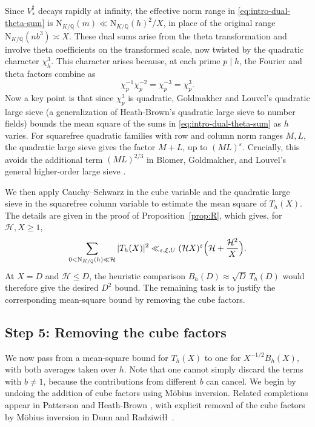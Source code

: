 \documentclass[11pt,a4paper]{article}
\numberwithin{equation}{section}
\numberwithin{figure}{section}
\theoremstyle{definition}
\theoremstyle{remark}
\newcommand{\Q}{\mathbb Q}
\newcommand{\NK}{\mathrm N_{K/\Q}}
\begin{document}
Since $V_*^\sharp$ decays rapidly at infinity, the effective norm range in \eqref{eq:intro-dual-theta-sum} is $\NK(m)\ll\NK(h)^2/X$, in place of the original range $\NK(nb^3)\asymp X$. These dual sums arise from the theta transformation and involve theta coefficients on the transformed scale, now twisted by the quadratic character $\chi_h^3$. This character arises because, at each prime $p\mid h$, the Fourier and theta factors combine as
\begin{equation}\label{eq:intro-quadratic-twist}
 \chi_p^{-1}\chi_p^{-2}=\chi_p^{-3}=\chi_p^3.
\end{equation}
Now a key point is that since $\chi_p^3$ is quadratic, Goldmakher and Louvel's quadratic large sieve \cite[Theorem~1.1 and Corollary~1.2]{GL} (a generalization of Heath-Brown's quadratic large sieve \cite{HB95} to number fields) bounds the mean square of the sums in \eqref{eq:intro-dual-theta-sum} as $h$ varies. For squarefree quadratic families with row and column norm ranges $M,L$, the quadratic large sieve gives the factor $M+L$, up to $(ML)^\varepsilon$. Crucially, this avoids the additional term $(ML)^{2/3}$ in Blomer, Goldmakher, and Louvel's general higher-order large sieve \cite[Theorem~1.3]{BGL}.

We then apply Cauchy--Schwarz in the cube variable and the quadratic
large sieve in the squarefree column variable to estimate the mean square of $T_h(X)$. The details are given in the proof of Proposition~\ref{prop:R}, which gives, for $\mathcal H,X\ge1$,
\begin{equation}\label{eq:intro-completed-ms}
 \sum_{0<\NK(h)\ll\mathcal H}|T_h(X)|^2
 \ll_{\varepsilon,\xi,U}(\mathcal H X)^\varepsilon
       \Bigl(\mathcal H+\frac{\mathcal H^2}{X}\Bigr).
\end{equation}
At $X=D$ and $\mathcal H\le D$, the heuristic comparison
$B_h(D)\approx\sqrt D\,T_h(D)$ would therefore give the desired
$D^2$ bound. The remaining task is to justify the corresponding
mean-square bound by removing the cube factors.

\subsection{Step 5: Removing the cube factors} 
We now pass from a mean-square bound for $T_h(X)$ to one for $X^{-1/2}B_h(X)$, with both averages taken over $h$. Note that one cannot simply discard the terms with $b\ne1$, because the contributions from different $b$ can cancel. We begin by undoing the addition of cube factors using M\"obius inversion. Related completions appear in Patterson \cite[Theorem~6.1]{Pat77} and Heath-Brown \cite[\S3]{HB00}, with explicit removal of the cube factors by M\"obius inversion in Dunn and Radziwi\l\l\ \cite[Proposition~5.3 and (8.2)]{DR}.
\end{document}
